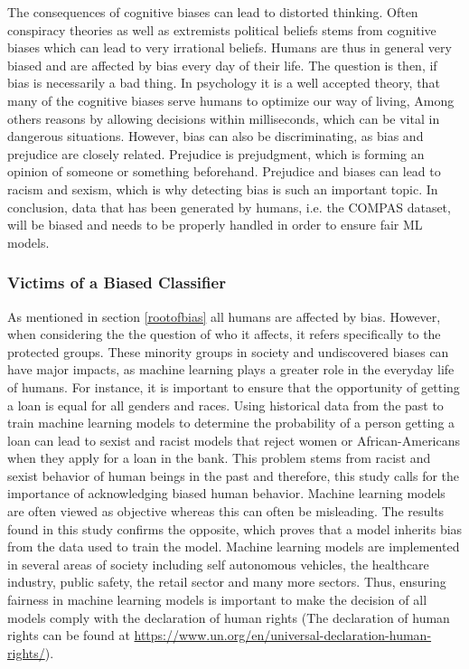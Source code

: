 \documentclass[11pt, fleqn, titlepage]{article}
\begin{document}
	The consequences of cognitive biases can lead to distorted thinking. Often conspiracy theories as well as extremists political beliefs stems from cognitive biases which can lead to very irrational beliefs. \cite{cog_bias} Humans are thus in general very biased and are affected by bias every day of their life. The question is then, if bias is necessarily a bad thing. In psychology it is a well accepted theory, that many of the cognitive biases serve humans to optimize our way of living, Among others reasons by allowing decisions within milliseconds, which can be vital in dangerous situations. \cite{reisberg} However, bias can also be discriminating, as bias and prejudice are closely related. Prejudice is prejudgment, which is forming an opinion of someone or something beforehand. Prejudice and biases can lead to racism and sexism, which is why detecting bias is such an important topic. In conclusion, data that has been generated by humans, i.e. the COMPAS dataset, will be biased and needs to be properly handled in order to ensure fair ML models.
	
	\subsubsection{Victims of a Biased Classifier}
	As mentioned in section \ref{rootofbias} all humans are affected by bias. However, when considering the the question of who it affects, it refers specifically to the protected groups. These minority groups in society and undiscovered biases can have major impacts, as machine learning plays a greater role in the everyday life of humans. For instance, it is important to ensure that the opportunity of getting a loan is equal for all genders and races. Using historical data from the past to train machine learning models to determine the probability of a person getting a loan can lead to sexist and racist models that reject women or African-Americans when they apply for a loan in the bank. This problem stems from racist and sexist behavior of human beings in the past and therefore, this study calls for the importance of acknowledging biased human behavior. Machine learning models are often viewed as objective whereas this can often be misleading. The results found in this study confirms the opposite, which proves that a model inherits bias from the data used to train the model. Machine learning models are implemented in several areas of society including self autonomous vehicles, the healthcare industry, public safety, the retail sector and many more sectors. Thus, ensuring fairness in machine learning models is important to make the decision of all models comply with the declaration of human rights (The declaration of human rights can be found at \url{https://www.un.org/en/universal-declaration-human-rights/}).
	
\end{document}
